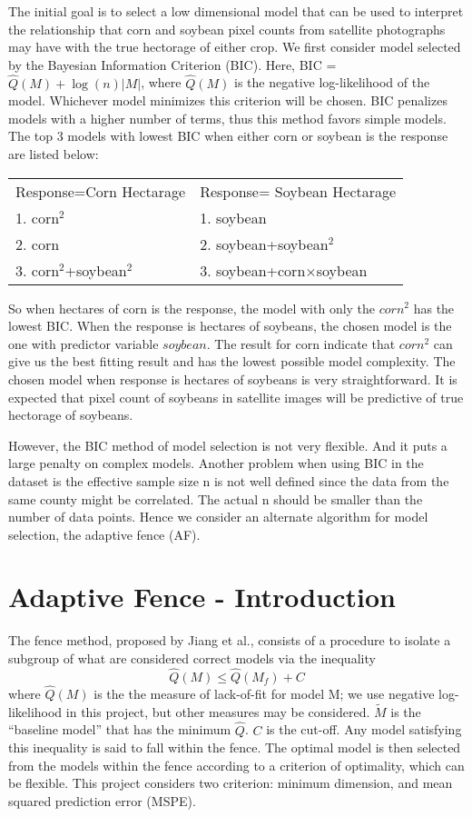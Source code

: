\documentclass[11pt,letter]{article}
\begin{document}
The initial goal is to select a low dimensional model that can be used to interpret the relationship that corn and soybean pixel counts from satellite photographs may have with the true hectorage of either crop.  We first consider model selected by the Bayesian Information Criterion (BIC).  Here, BIC = $\hat Q(M) + \log(n) |M|$, where $\hat Q(M)$ is the negative log-likelihood of the model.  Whichever model minimizes this criterion will be chosen.  BIC penalizes models with a higher number of terms, thus this method favors simple models.  The top 3 models with lowest BIC when either corn or soybean is the response  are listed below:
\begin{center}
\begin{tabular}{l l}
Response=Corn Hectarage & Response= Soybean Hectarage\\
1. corn$^2$ & 1. soybean\\
2. corn & 2. soybean+soybean$^2$\\
3. corn$^2$+soybean$^2$ & 3. soybean+corn$\times$soybean\\
\end{tabular}
\end{center}
So when hectares of corn is the response, the model with only the  $corn^2$ has the lowest BIC.  When the response is hectares of soybeans, the chosen model is the one with predictor variable $soybean$.  The result for corn indicate that $corn^2$ can give us the best fitting result and has the lowest possible model complexity.  The chosen model when response is hectares of soybeans is very straightforward.  It is expected that pixel count of soybeans in satellite images will be predictive of true hectorage of soybeans.  

However, the BIC method of model selection is not very flexible. And it puts a large penalty on  complex models. Another problem when using BIC in the dataset is the effective sample size n is not well defined since the data from the same county might be correlated. The actual n should be smaller than the number of data points. Hence we consider an alternate algorithm for model selection, the adaptive fence (AF). 

\section{Adaptive Fence - Introduction}

The fence method, proposed by Jiang et al., consists of a procedure to isolate a subgroup of what are considered correct models via the inequality
$$\hat Q(M)\le\hat Q(M_f)+C$$
where $\hat{Q}(M)$ is the the measure of lack-of-fit for model M; we use negative log-likelihood in this project, but other measures may be considered.  $\tilde{M}$ is the “baseline model” that has the minimum $\hat{Q}$. $C$ is the cut-off.  Any model satisfying this inequality is said to fall within the fence.  The optimal model is then selected from the models within the fence according to a criterion of optimality, which can be flexible. This project considers two criterion: minimum dimension, and mean squared prediction error (MSPE).
\end{document}
